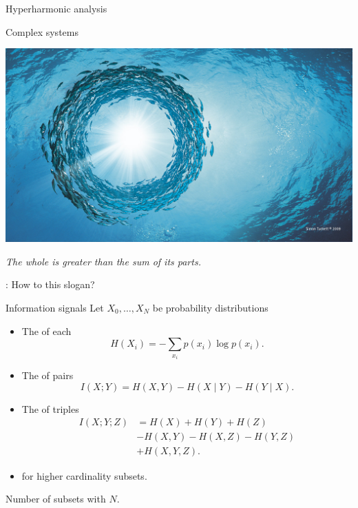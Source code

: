 
\begin{frame}
	\centering
	\vspace*{2.6cm}
	\Huge {}
	\vskip 20pt
	\Large Hyperharmonic analysis
\end{frame}

\begin{frame}{Complex systems}

	\includegraphics[scale=.23]{aux/fishes}

	\bigskip
	\textit{The whole is greater than the sum of its parts.}

	\pause\vskip 10pt
	: How to  this slogan?
\end{frame}

\begin{frame}{Information signals}
	\pause
	Let $X_0, \dots, X_N$ be probability distributions

	\vskip 5pt

	\begin{itemize}
		\pause\item The  of each
		\[
		\textstyle H(X_i) = - \sum_{x_i} p(x_i) \log p(x_i).
		\]
		\vspace*{-20pt}\pause\item The  of pairs
		\[
		I(X; Y) = H(X, Y) - H(X \mid Y) - H(Y \mid X).
		\]
		\vspace*{-20pt}\pause\item The  of triples
		\begin{align*}
			I(X;Y;Z) &=
			H(X) + H(Y) + H(Z) \\
			& - H(X,Y) - H(X,Z) - H(Y,Z) \\
			& + H(X,Y,Z).
		\end{align*}
		\vspace*{-20pt}\pause\item {} for higher cardinality subsets.
	\end{itemize}

	\vskip 10pt
	\pause

	 Number of subsets  with $N$.
\end{frame}

